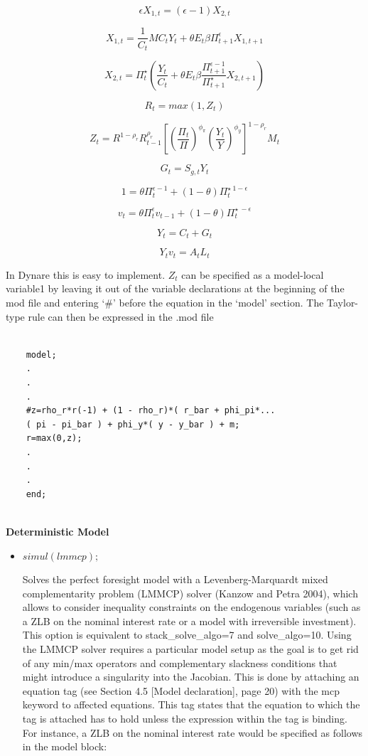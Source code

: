 \documentclass[10pt,math=newtx,citestyle=gb7714-2015,bibstyle=gb7714-2015]{elegantbook}
\begin{document}
{$$\epsilon X_{1,t}=(\epsilon-1)X_{2,t}$$

$$X_{1,t}=\frac{1}{C_t}MC_tY_t+\theta E_t\beta \Pi_{t+1}^{\epsilon}X_{1,t+1}$$

$$X_{2,t}=\Pi_t^{\star}\left(\frac{Y_t}{C_t}+\theta E_t \beta \frac{\Pi_{t+1}^{\epsilon-1}}{\Pi_{t+1}^{\star}}X_{2,t+1}\right)$$

$$R_t=max(1,Z_t)$$

$$Z_t=R^{1-\rho_r}R_{t-1}^{\rho_r}\left[\left(\frac{\Pi_t}{\Pi}\right)^{\phi_{\pi}}\left(\frac{Y_t}{Y}\right)^{\phi_y}\right]^{1-\rho_r}M_t$$

$$G_t=S_{g,t}Y_t$$

$$1=\theta\Pi_t^{\epsilon-1}+(1-\theta)\Pi_t^{\star~1-\epsilon}$$

$$v_t=\theta\Pi_t^{\epsilon}v_{t-1}+(1-\theta)\Pi_t^{\star~-\epsilon}$$

$$Y_t=C_t+G_t$$

$$Y_tv_t=A_tL_t$$

In Dynare this is easy to implement. $Z_t$ can be specified as a model-local variable1 by leaving it out of the variable declarations at the beginning of the mod file and entering ‘\#’ before the equation in the ‘model’ section. The Taylor-type rule can then be expressed in the .mod file

\begin{lstlisting}[frame=shadowbox]
	
	model;
	.
	.
	.
	#z=rho_r*r(-1) + (1 - rho_r)*( r_bar + phi_pi*...
	( pi - pi_bar ) + phi_y*( y - y_bar ) + m;
	r=max(0,z);
	.
	.
	.
	end;
	
\end{lstlisting}

\textbf{Deterministic Model}
\begin{itemize}
	\item $simul(lmmcp);$
	
	Solves the perfect foresight model with a Levenberg-Marquardt mixed complementarity problem (LMMCP) solver (Kanzow and Petra 2004), which allows to consider inequality constraints on the endogenous variables (such as a ZLB on the nominal interest rate or a model with irreversible investment). This option is equivalent to stack\_solve\_algo=7 and solve\_algo=10. Using the LMMCP solver requires a particular model setup as the goal is to get rid of any min/max operators and complementary slackness conditions that might introduce a singularity into the Jacobian. This is done by attaching an equation tag (see Section 4.5 [Model declaration], page 20) with the mcp keyword to affected equations. This tag states that the equation to which the tag is attached has to hold unless the expression within the tag is binding. For instance, a ZLB on the nominal interest rate would be specified as follows in the model block:
	

\end{itemize}}
\end{document}
